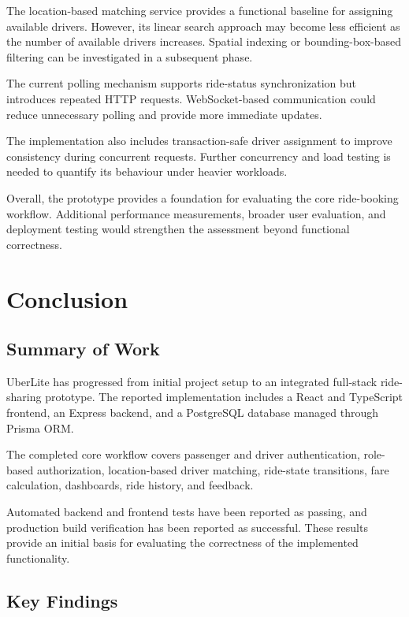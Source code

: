 \documentclass{tietreport}
\begin{document}
The location-based matching service provides a functional
baseline for assigning available drivers. However, its
linear search approach may become less efficient as the
number of available drivers increases. Spatial indexing or
bounding-box-based filtering can be investigated in a
subsequent phase.

The current polling mechanism supports ride-status
synchronization but introduces repeated HTTP requests.
WebSocket-based communication could reduce unnecessary
polling and provide more immediate updates.

The implementation also includes transaction-safe driver
assignment to improve consistency during concurrent requests.
Further concurrency and load testing is needed to quantify
its behaviour under heavier workloads.

Overall, the prototype provides a foundation for evaluating
the core ride-booking workflow. Additional performance
measurements, broader user evaluation, and deployment testing
would strengthen the assessment beyond functional correctness.


\chapter{Conclusion}

\section{Summary of Work}

UberLite has progressed from initial project setup to an
integrated full-stack ride-sharing prototype. The reported
implementation includes a React and TypeScript frontend,
an Express backend, and a PostgreSQL database managed
through Prisma ORM.

The completed core workflow covers passenger and driver
authentication, role-based authorization, location-based
driver matching, ride-state transitions, fare calculation,
dashboards, ride history, and feedback.

Automated backend and frontend tests have been reported
as passing, and production build verification has been
reported as successful. These results provide an initial
basis for evaluating the correctness of the implemented
functionality.

\section{Key Findings}
\end{document}
